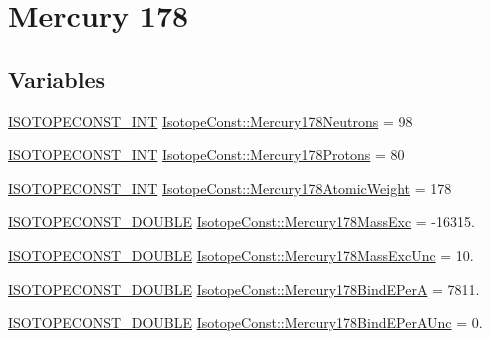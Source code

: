 \hypertarget{group___isotope_const-_mercury-_hg178}{}\section{Mercury 178}
\label{group___isotope_const-_mercury-_hg178}
\subsection*{Variables}
\begin{DoxyCompactItemize}
\item 
\mbox{\hyperlink{group___isotope_const-_macros_ga5f18360b3e99483a35c32d789e62621c}{I\+S\+O\+T\+O\+P\+E\+C\+O\+N\+S\+T\+\_\+\+I\+NT}} \mbox{\hyperlink{group___isotope_const-_mercury-_hg178_ga0122741cb8f38c65733188a3e6ec1f78}{Isotope\+Const\+::\+Mercury178\+Neutrons}} = 98
\item 
\mbox{\hyperlink{group___isotope_const-_macros_ga5f18360b3e99483a35c32d789e62621c}{I\+S\+O\+T\+O\+P\+E\+C\+O\+N\+S\+T\+\_\+\+I\+NT}} \mbox{\hyperlink{group___isotope_const-_mercury-_hg178_ga1e67bd41c1de3361e07464f6408b9834}{Isotope\+Const\+::\+Mercury178\+Protons}} = 80
\item 
\mbox{\hyperlink{group___isotope_const-_macros_ga5f18360b3e99483a35c32d789e62621c}{I\+S\+O\+T\+O\+P\+E\+C\+O\+N\+S\+T\+\_\+\+I\+NT}} \mbox{\hyperlink{group___isotope_const-_mercury-_hg178_gaffc8b176f783b561b95673c2c51cefa3}{Isotope\+Const\+::\+Mercury178\+Atomic\+Weight}} = 178
\item 
\mbox{\hyperlink{group___isotope_const-_macros_ga8f45a7272ce02c0b4c65c44636ed719a}{I\+S\+O\+T\+O\+P\+E\+C\+O\+N\+S\+T\+\_\+\+D\+O\+U\+B\+LE}} \mbox{\hyperlink{group___isotope_const-_mercury-_hg178_ga009fe41013625d0a1d688c1ab92daabf}{Isotope\+Const\+::\+Mercury178\+Mass\+Exc}} = -\/16315.
\item 
\mbox{\hyperlink{group___isotope_const-_macros_ga8f45a7272ce02c0b4c65c44636ed719a}{I\+S\+O\+T\+O\+P\+E\+C\+O\+N\+S\+T\+\_\+\+D\+O\+U\+B\+LE}} \mbox{\hyperlink{group___isotope_const-_mercury-_hg178_ga3ec8dd9e3a642931907121931755d6e0}{Isotope\+Const\+::\+Mercury178\+Mass\+Exc\+Unc}} = 10.
\item 
\mbox{\hyperlink{group___isotope_const-_macros_ga8f45a7272ce02c0b4c65c44636ed719a}{I\+S\+O\+T\+O\+P\+E\+C\+O\+N\+S\+T\+\_\+\+D\+O\+U\+B\+LE}} \mbox{\hyperlink{group___isotope_const-_mercury-_hg178_ga284c589e39298255ab50982a3bfd3c1e}{Isotope\+Const\+::\+Mercury178\+Bind\+E\+PerA}} = 7811.
\item 
\mbox{\hyperlink{group___isotope_const-_macros_ga8f45a7272ce02c0b4c65c44636ed719a}{I\+S\+O\+T\+O\+P\+E\+C\+O\+N\+S\+T\+\_\+\+D\+O\+U\+B\+LE}} \mbox{\hyperlink{group___isotope_const-_mercury-_hg178_gaf90c6d34e11208c63f8fe7d6506fb958}{Isotope\+Const\+::\+Mercury178\+Bind\+E\+Per\+A\+Unc}} = 0.

\end{DoxyCompactItemize}
